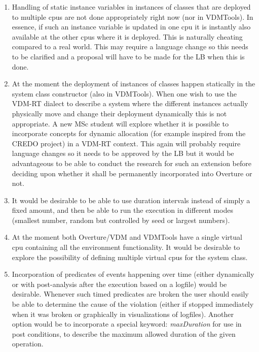 \documentclass{overturerep}
\begin{document}
\begin{enumerate}
\item Handling of static instance variables in instances of classes
  that are deployed to multiple cpus are not done appropriately
  right now (nor in VDMTools). In essence, if such an instance variable
  is updated in one cpu it is instantly also available at the other
  cpus where it is deployed. This is naturally cheating compared to a
  real world. This may require a language change so this needs to be
  clarified and a proposal will have to be made for the LB when this
  is done.
\item At the moment the deployment of instances of classes happen
  statically in the system class constructor (also in VDMTools). When
  one wish to use the VDM-RT dialect to describe a system where the
  different instances actually physically move and change their
  deployment dynamically this is not appropriate. A new MSc student
  will explore whether it is possible to incorporate concepts for
  dynamic allocation (for example inspired from the CREDO project) in
  a VDM-RT context. This again will probably require language changes
  so it needs to be approved by the LB but it would be advantageous to
  be able to conduct the research for such an extension before
  deciding upon whether it shall be permanently incorporated into
  Overture or not.
\item It would be desirable to be able to use duration intervals
  instead of simply a fixed amount, and then be able to run the
  execution in different modes (smallest number, random but controlled
  by seed or largest numbers).
\item At the moment both Overture/VDM and VDMTools have a single
  virtual cpu containing all the environment functionality. It would
  be desirable to explore the possibility of defining multiple virtual
  cpus for the system class.
\item Incorporation of predicates of events happening over time
  (either dynamically or with post-analysis after the execution based
  on a logfile) would be desirable. Whenever such timed predicates are
  broken the user should easily be able to determine the cause of the
  violation (either if stopped immediately when it was broken or
  graphically in visualizations of logfiles). Another option would be to
  incorporate a special keyword: \emph{maxDuration} for use in post 
  conditions, to describe the maximum allowed duration of the given 
  operation.
\end{enumerate}
\end{document}
